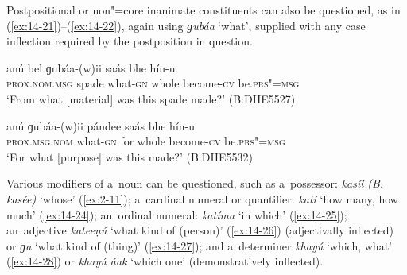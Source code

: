 Postpositional or non"=core inanimate constituents can also be questioned, as in (\ref{ex:14-21})--(\ref{ex:14-22}), again using \textit{ɡubáa} `what', supplied with any case inflection required by the postposition in question.

\begin{exe}
\ex
\label{ex:14-21}
\gll anú bel ɡubáa-(w)ii saás bhe  hín-u  \\
\textsc{prox.nom.msg} spade what-\textsc{gn} whole become-\textsc{cv}  be.\textsc{prs"=msg} \\
\glt `From what [material] was this spade made?' (B:DHE5527)

\ex
\label{ex:14-22}
\gll anú ɡubáa-(w)ii pándee saás bhe  hín-u \\
\textsc{prox.msg.nom} what-\textsc{gn} for whole become-\textsc{cv}  be.\textsc{prs"=msg} \\
\glt `For what [purpose] was this made?' (B:DHE5532)
\end{exe}

 Various modifiers of a~noun can be questioned,
such as a~possessor: \textit{kasíi} \textit{(B. kasée)} `whose' (\ref{ex:2-11});
a~cardinal numeral or quantifier: \textit{katí} `how many, how much' (\ref{ex:14-24});
an~ordinal numeral: \textit{katíma} `in which' (\ref{ex:14-25}); an~adjective
\textit{kateeṇú} `what kind of (person)' (\ref{ex:14-26}) (adjectivally inflected) or
\textit{ɡa} `what kind of (thing)' (\ref{ex:14-27}); and a~determiner \textit{khayú} `which,
what' (\ref{ex:14-28}) or \textit{khayú áak} `which one' (demonstratively inflected).

